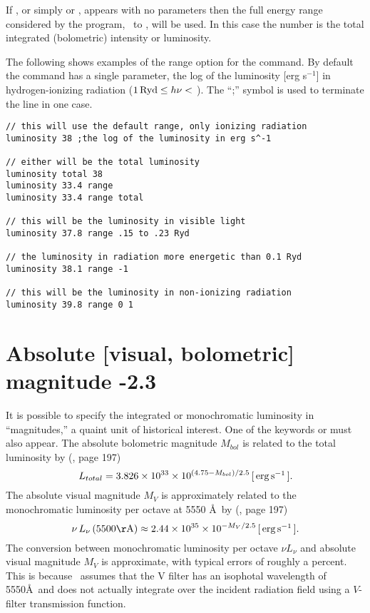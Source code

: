 If , or simply  or ,
appears with no parameters then the
full energy range considered by the program,
\emm\ to
\egamry , will be used.
In this case the number is the total integrated (bolometric) intensity
or luminosity.

The following shows examples of the range option for the
 command.
By default the  command has a single parameter,
the log of the luminosity [erg s$^{-1}$] in hydrogen-ionizing
radiation ($1 {\rm\thinspace Ryd} \le  h\nu <$ \egamry ).
The ``;'' symbol is used to terminate the line in one
case.
\begin{verbatim}
// this will use the default range, only ionizing radiation
luminosity 38 ;the log of the luminosity in erg s^-1

// either will be the total luminosity
luminosity total 38
luminosity 33.4 range
luminosity 33.4 range total

// this will be the luminosity in visible light
luminosity 37.8 range .15 to .23 Ryd

// the luminosity in radiation more energetic than 0.1 Ryd
luminosity 38.1 range -1

// this will be the luminosity in non-ionizing radiation
luminosity 39.8 range 0 1
\end{verbatim}

\section{Absolute [visual, bolometric] magnitude -2.3}

It is possible to specify the integrated or monochromatic luminosity
in ``magnitudes,'' a quaint unit of historical interest.
One of the keywords
 or  must also appear.
The absolute bolometric magnitude
$M_{bol}$ is related to the total luminosity by (\citealp{Allen1976}, page 197)
\begin{equation}
L_{total}  = 3.826 \times 10^{33}  \times 10^{\left( {4.75 - M_{bol} }
\right)/2.5}\,
 [\mbox{${\rm\thinspace erg}{\rm\thinspace s}^{-1}\,$}].
\end{equation}
The absolute visual magnitude $M_V$ is approximately related to the
monochromatic luminosity per octave at 5550 \AA\
by (\citealp{Allen1976}, page 197)
\begin{equation}
\nu \,L_\nu  \left( 5500\mathrm{\AA}\right) \approx 2.44 \times 10^{35}
\times 10^{ - M_V /2.5}\,
[\ergps].
\end{equation}
The conversion between monochromatic luminosity per octave $\nu L_{\nu}$ and absolute
visual magnitude $M_V$ is approximate,
with typical errors of roughly a percent.
This is because \Cloudy\ assumes that the V filter has an
isophotal wavelength of 5550\AA\ and does not actually integrate
over the incident radiation field using
a $V$-filter transmission function.

